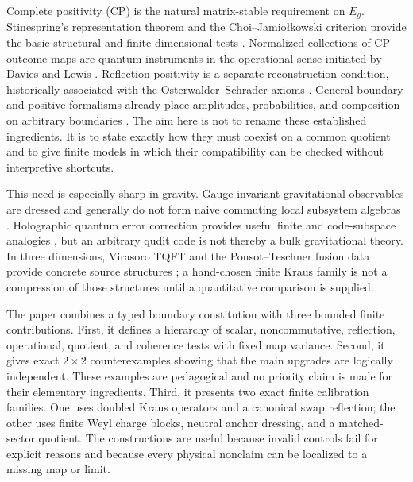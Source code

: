 \documentclass[11pt,a4paper]{article}
\theoremstyle{definition}
\theoremstyle{remark}
\begin{document}
Complete positivity (CP) is the natural matrix-stable requirement on $E_g$.
Stinespring's representation theorem and the Choi--Jamio\l kowski criterion provide
the basic structural and finite-dimensional tests
\cite{Stinespring1955,Jamiolkowski1972,Choi1975}.  Normalized collections of CP outcome
maps are quantum instruments in the operational sense initiated by Davies and Lewis
\cite{DaviesLewis1970,Kraus1983}.  Reflection positivity is a separate reconstruction
condition, historically associated with the Osterwalder--Schrader axioms
\cite{OsterwalderSchrader1973,OsterwalderSchrader1975}.  General-boundary and positive
formalisms already place amplitudes, probabilities, and composition on arbitrary
boundaries \cite{Oeckl2008,Oeckl2013}.  The aim here is not to rename these established
ingredients.  It is to state exactly how they must coexist on a common quotient and to
give finite models in which their compatibility can be checked without interpretive
shortcuts.

This need is especially sharp in gravity.  Gauge-invariant gravitational observables
are dressed and generally do not form naive commuting local subsystem algebras
\cite{DonnellyGiddings2016}.  Holographic quantum error correction provides useful
finite and code-subspace analogies
\cite{AlmheiriDongHarlow2015,PastawskiEtAl2015,Harlow2017}, but an arbitrary qudit code
is not thereby a bulk gravitational theory.  In three dimensions, Virasoro TQFT and
the Ponsot--Teschner fusion data provide concrete source structures
\cite{PonsotTeschner1999,CollierEberhardtZhang2023,CollierEberhardtZhang2024}; a
hand-chosen finite Kraus family is not a compression of those structures until a
quantitative comparison is supplied.

The paper combines a typed boundary constitution with three bounded finite contributions.  First, it defines a hierarchy of scalar,
noncommutative, reflection, operational, quotient, and coherence tests with fixed map
variance.  Second, it gives exact $2\times2$ counterexamples showing that the main
upgrades are logically independent.  These examples are pedagogical and no priority
claim is made for their elementary ingredients.  Third, it presents two exact finite
calibration families.  One uses doubled Kraus operators and a canonical swap
reflection; the other uses finite Weyl charge blocks, neutral anchor dressing, and a
matched-sector quotient.  The constructions are useful because invalid controls fail
for explicit reasons and because every physical nonclaim can be localized to a missing
map or limit.
\end{document}
